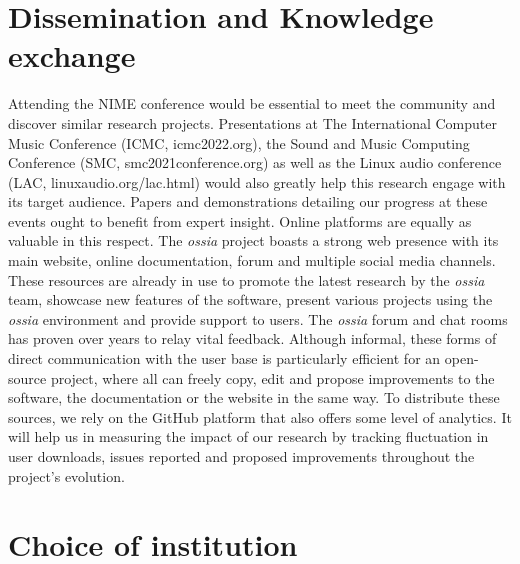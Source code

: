 \documentclass[journal,onecolumn]{IEEEtran}
\begin{document}
\section{Dissemination and Knowledge exchange} %
Attending the NIME conference would be essential to meet the community and discover similar research projects. Presentations at The International Computer Music Conference (ICMC, icmc2022.org), the Sound and Music Computing Conference (SMC, smc2021conference.org) as well as the Linux audio conference (LAC, linuxaudio.org/lac.html) would also greatly help this research engage with its target audience. Papers and demonstrations detailing our progress at these events ought to benefit from expert insight. Online platforms are equally as valuable in this respect. The \textit{ossia} project boasts a strong web presence with its main website, online documentation, forum and multiple social media channels. These resources are already in use to promote the latest research by the \textit{ossia} team, showcase new features of the software, present various projects using the \textit{ossia} environment and provide support to users. The \textit{ossia} forum and chat rooms has proven over years to relay vital feedback. Although informal, these forms of direct communication with the user base is particularly efficient for an open-source project, where all can freely copy, edit and propose improvements to the software, the documentation or the website in the same way. To distribute these sources, we rely on the GitHub platform that also offers some level of analytics. It will help us in measuring the impact of our research by tracking fluctuation in user downloads, issues reported and proposed improvements throughout the project's evolution. 

\section{Choice of institution} %
\end{document}

